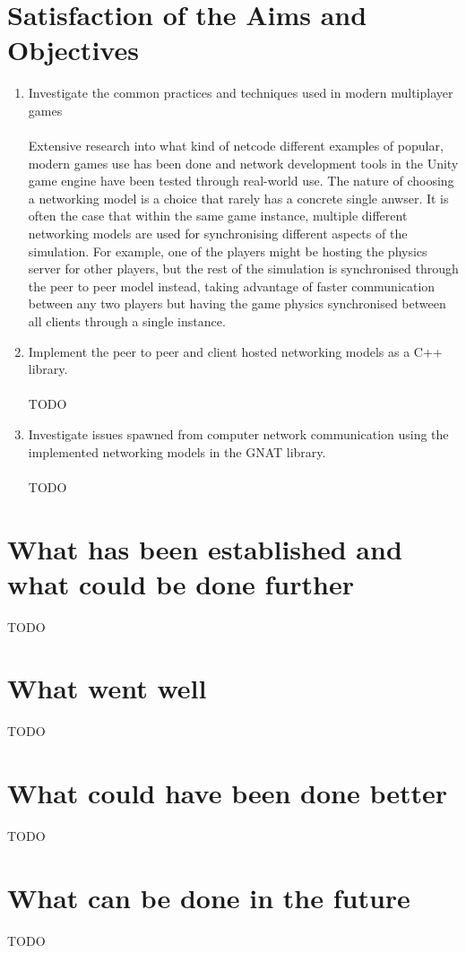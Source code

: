 \section{Satisfaction of the Aims and Objectives}
\begin{enumerate}
\item Investigate the common practices and techniques used in modern multiplayer games
  \\\\
  Extensive research into what kind of netcode different examples of popular, modern games use has been done and network development tools in the Unity game engine have been tested through real-world use. The nature of choosing a networking model is a choice that rarely has a concrete single anwser. It is often the case that within the same game instance, multiple different networking models are used for synchronising different aspects of the simulation. For example, one of the players might be hosting the physics server for other players, but the rest of the simulation is synchronised through the peer to peer model instead, taking advantage of faster communication between any two players but having the game physics synchronised between all clients through a single instance.


\item Implement the peer to peer and client hosted networking models as a C++ library.
  \\\\
  TODO

\item Investigate issues spawned from computer network communication using the implemented networking models in the GNAT library.
  \\\\
  TODO
\end{enumerate}





\section{What has been established and what could be done further}
TODO


\section{What went well}
TODO


\section{What could have been done better}
TODO


\section{What can be done in the future}
TODO
